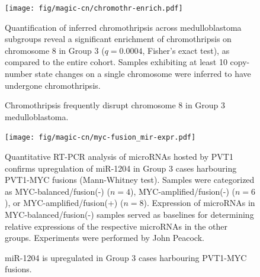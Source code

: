 \documentclass[11pt,letterpaper]{article}
\theoremstyle{definition}
\begin{document}
\begin{figure}[h]
	\begin{center}
		\texttt{[image: fig/magic-cn/chromothr-enrich.pdf]}
	\end{center}
	\caption{Chromothripsis frequently disrupt chromosome 8 in Group 3 medulloblastoma.}
	Quantification of inferred chromothripsis across medulloblastoma subgroups reveal a significant enrichment of chromothripsis on chromosome 8 in Group 3 ($q = 0.0004$, Fisher's exact test), as compared to the entire cohort. Samples exhibiting at least 10 copy-number state changes on a single chromosome were inferred to have undergone chromothripsis.
	\label{fig:chromothr-enrich}
\end{figure}

\begin{figure}[h]
	\begin{center}
		\texttt{[image: fig/magic-cn/myc-fusion\_mir-expr.pdf]}
	\end{center}
	\caption{miR-1204 is upregulated in Group 3 cases harbouring PVT1-MYC fusions.}
	Quantitative RT-PCR analysis of microRNAs hosted by PVT1 confirms upregulation of miR-1204 in Group 3 cases harbouring PVT1-MYC fusions (Mann-Whitney test). Samples were categorized as MYC-balanced/fusion(-) ($n = 4$), MYC-amplified/fusion(-) ($n = 6$), or MYC-amplified/fusion(+) ($n = 8$). Expression of microRNAs in MYC-balanced/fusion(-) samples served as baselines for determining relative expressions of the respective microRNAs in the other groups. Experiments were performed by John Peacock.
	\label{fig:myc-fusion_mir-expr}
\end{figure}




\clearpage

\begin{multicols}{2}
\small
{}
\end{multicols}

\clearpage

\end{document}
